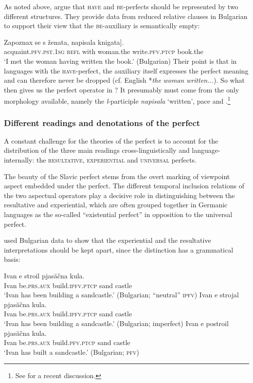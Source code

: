 \documentclass[output=paper,colorlinks,citecolor=brown]{langscibook}
\begin{document}
As noted above,
\citet{iatridou01} argue that {\textsc{have}} and {\textsc{be}}-perfects  should be represented by two different structures. They provide data from reduced relative clauses in Bulgarian to support their view that the {\textsc{be}}-auxiliary  is semantically empty: 

\ea\label{relbul}\gll 
Zapoznax se s ženata, \minsp{[} napisala knigata].\\
acquaint.\textsc{pfv.}\textsc{pst.1sg} \textsc{refl} with woman.the {} write.\textsc{pfv}.\textsc{ptcp} book.the\\
\glt`I met the woman having written the book.' \hfill (Bulgarian)
\z
Their point is that in languages with the {\textsc{have}}-perfect, the auxiliary itself expresses the perfect meaning and can therefore never be dropped (cf. English {*}\textit{the} \textit{woman} \textit{written...}).
So what then gives us the perfect operator in ? It presumably must come from the only morphology available, namely the {\textit{l}}-participle \textit{napisala} `written', pace \citet{whaley00} and \citet{blaszczak14}.\footnote{See \citet{gronn_stechow2020} for a recent discussion.}

\subsubsection{Different readings and denotations of the perfect}
A constant challenge for the theories of the perfect is to account for the distribution of the three main readings
cross-linguistically and language-internally: the \textsc{resultative}, \textsc{experiential} and \textsc{universal} perfects.

The beauty of the Slavic perfect stems from the  overt marking of viewpoint aspect embedded under the perfect. The different temporal inclusion relations of the two aspectual operators  play a decisive role in distinguishing between the resultative and experiential, which are often grouped together in Germanic languages as the so-called ``existential perfect'' in opposition to the universal perfect. 

\citet[295]{pancheva03} used Bulgarian data to show that the experiential and 
the resultative interpretations should be kept apart, since the distinction has a grammatical basis:

\ea\ea\label{stroil}\gll Ivan e stroil pjasăčna kula. \\
Ivan be.\textsc{prs}.\textsc{aux} build.\textsc{ipfv}.\textsc{ptcp} sand castle \\
\glt `Ivan has been building a sandcastle.' \hfill (Bulgarian; ``neutral'' \textsc{ipfv})
 \ex\label{strojal}\gll Ivan e strojal pjasăčna kula. \\
Ivan be.\textsc{prs}.\textsc{aux} build.\textsc{ipfv}.\textsc{ptcp} sand castle \\
\glt
`Ivan has been building a sandcastle.' 
\hfill (Bulgarian; imperfect)
\ex\label{postroil}\gll Ivan e postroil pjasăčna kula. \\
Ivan be.\textsc{prs}.\textsc{aux} build.\textsc{pfv}.\textsc{ptcp} sand castle \\
\glt
`Ivan has built a sandcastle.'
\hfill (Bulgarian; \textsc{pfv})
\z\z
\end{document}
